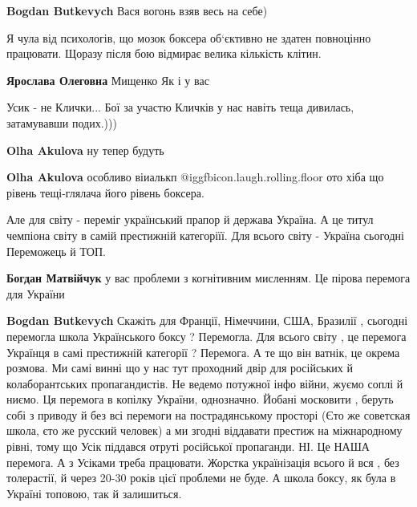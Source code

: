 \begin{itemize}
\begin{itemize}
\textbf{Bogdan Butkevych} Вася вогонь взяв весь на себе)
\end{itemize} %


Я чула від психологів, що мозок боксера об‘єктивно не здатен повноцінно
працювати. Щоразу після бою відмирає велика кількість клітин.

\begin{itemize} %
\textbf{Ярослава Олеговна} Мищенко Як і у вас
\end{itemize} %

Усик - не Клички... Бої за участю Кличків у нас навіть теща дивилась,
затамувавши подих.)))

\begin{itemize} %
\textbf{Olha Akulova} ну тепер будуть

\textbf{Olha Akulova} особливо віиалькп @igg{fbicon.laugh.rolling.floor} ото хіба що рівень тещі-глялача його рівень боксера.
\end{itemize} %


Але для світу - переміг український прапор й держава Україна. А це титул
чемпіона світу в самій престижній категоріїї. Для всього світу - Україна
сьогодні Переможець й ТОП.

\begin{itemize} %
\textbf{Богдан Матвійчук} у вас проблеми з когнітивним мисленням. Це пірова перемога для України

\textbf{Bogdan Butkevych} Скажіть для Франції, Німеччини, США, Бразилії ,
сьогодні перемогла школа Українського боксу ? Перемогла. Для всього світу , це
перемога Українця в самі престижній категорії ? Перемога. А те що він ватнік,
це окрема розмова. Ми самі винні що у нас тут проходний двір для російських й
колаборантських пропагандистів. Не ведемо потужної інфо війни, жуємо соплі й
ниємо. Ця перемога в копілку України, однозначно. Йобані московити , беруть
собі з приводу й без всі перемоги на пострадянському просторі (Єто же советская
школа, єто же русский человек) а ми згодні віддавати престиж на міжнародному
рівні, тому що Усік піддався отруті російської пропаганди. НІ. Це НАША
перемога. А з Усіками треба працювати. Жорстка українізація всього й вся , без
толерастії, й через 20-30 років цієї проблеми не буде. А школа боксу, як була в
Україні топовою, так й залишиться.


\end{itemize}
\end{itemize}
